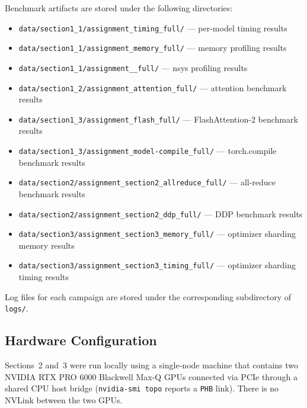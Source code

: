 \documentclass[letterpaper]{article}
\begin{document}
	Benchmark artifacts are stored under the following directories:
	
	\begin{itemize}
		\item \texttt{data/section1\_1/assignment\_timing\_full/} --- per-model timing results
		\item \texttt{data/section1\_1/assignment\_memory\_full/} --- memory profiling results
		\item \texttt{data/section1\_1/assignment\_\_full/} --- nsys profiling results
		\item \texttt{data/section1\_2/assignment\_attention\_full/} --- attention benchmark results
		\item \texttt{data/section1\_3/assignment\_flash\_full/} --- FlashAttention-2 benchmark results
		\item \texttt{data/section1\_3/assignment\_model-compile\_full/} --- torch.compile benchmark results
		\item \texttt{data/section2/assignment\_section2\_allreduce\_full/} --- all-reduce benchmark results
		\item \texttt{data/section2/assignment\_section2\_ddp\_full/} --- DDP benchmark results
		\item \texttt{data/section3/assignment\_section3\_memory\_full/} --- optimizer sharding memory results
		\item \texttt{data/section3/assignment\_section3\_timing\_full/} --- optimizer sharding timing results
	\end{itemize}
	
	Log files for each campaign are stored under the corresponding subdirectory of \texttt{logs/}.
	
	\subsection{Hardware Configuration}
	
	Sections~2 and~3 were run locally using a single-node machine that contains two NVIDIA RTX PRO 6000 Blackwell Max-Q GPUs connected via PCIe through a shared CPU host bridge (\texttt{nvidia-smi topo} reports a \texttt{PHB} link). There is no NVLink between the two GPUs.
	
\end{document}
